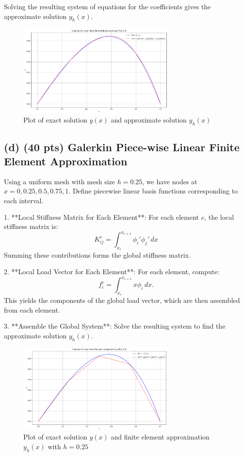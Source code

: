 \documentclass[11pt]{article}
\begin{document}
Solving the resulting system of equations for the coefficients gives the approximate solution \( y_h(x) \).


\begin{figure}[!h]
    \centering
    \includegraphics[width=0.7\textwidth]{images/problem2_3.png}
    \caption{Plot of exact solution $y(x)$ and approximate solution $y_h(x)$}
\end{figure}
\FloatBarrier
\subsection*{(d) (40 pts) Galerkin Piece-wise Linear Finite Element Approximation}

Using a uniform mesh with mesh size \( h = 0.25 \), we have nodes at \( x = 0, 0.25, 0.5, 0.75, 1 \). Define piecewise linear basis functions corresponding to each interval.

1. **Local Stiffness Matrix for Each Element**:
   For each element \( e \), the local stiffness matrix is:
   \[
   K_{ij}^e = \int_{x_e}^{x_{e+1}} \phi_i' \phi_j' \, dx 
   \]
   Summing these contributions forms the global stiffness matrix.

2. **Local Load Vector for Each Element**:
   For each element, compute:
   \[
   f_i^e = \int_{x_e}^{x_{e+1}} x \phi_i \, dx.
   \]
   This yields the components of the global load vector, which are then assembled from each element.

3. **Assemble the Global System**:
   Solve the resulting system to find the approximate solution \( y_h(x) \).

\begin{figure}[!h]
    \centering
    \includegraphics[width=0.7\textwidth]{images/problem2_4.png}
    \caption{Plot of exact solution $y(x)$ and finite element approximation $y_h(x)$ with $h=0.25$}
\end{figure}
\FloatBarrier
\end{document}
